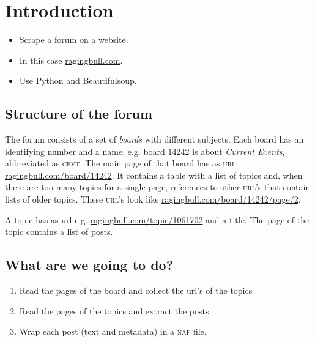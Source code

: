 \documentclass[twoside]{artikel3}
\title{\thedoctitle}
\author{\theauthor}
\date{\today \\ 09:30~h.}
\begin{document}
\maketitle
\begin{abstract}
  In this document a web-scraper is constructed that scrapes the forum
  \url{ragingbull.com}, using Python and Beautifulsoup.
\end{abstract}
\tableofcontents

\section{Introduction}
\label{sec:Introduction}

\begin{itemize}
\item Scrape a forum on a website.
\item In this case \url{ragingbull.com}.
\item Use Python and Beautifulsoup.
\end{itemize}

\subsection{Structure of the forum}
\label{sec:forumstructure}

The forum consists of a set of \emph{boards} with different
subjects. Each board has an identifying number and a name, e.g. board
14242 is about \emph{Current Events}, abbreviated as
\textsc{cevt}. The main page of that board has as \textsc{url}:
\url{ragingbull.com/board/14242}. It contains a table with a list
of topics and, when there are too many topics for a single page, references to other \textsc{url}'s that contain lists of
older topics. These \textsc{url}'s look like
\url{ragingbull.com/board/14242/page/2}.

A topic has as url e.g. \url{ragingbull.com/topic/1061702} and a title. The
page of the topic contains a list of posts. 

\subsection{What are we going to do?}
\label{sec:what}

\begin{enumerate}
\item Read the pages of the board and collect the url's of the topics
\item Read the pages of the topics and extract the posts.
\item Wrap each post (text and metadata) in a \textsc{naf} file.
\end{enumerate}
\end{document}
